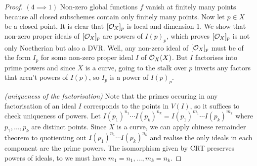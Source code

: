 \documentclass[./main.tex]{subfiles}
\begin{document}
\begin{proof}
  $(4 \implies 1)$
  Non-zero global functions $f$ vanish at finitely many points 
  because all closed subschemes contain only finitely many points. 
  Now let $p \in X$ be a closed point.
  It is clear that $[\mathcal{O}_X]_p$ is local and dimension 1.
  We show that non-zero proper ideals of $[\mathcal{O}_X]_p$ are powers of $I(p)_p$,
  which proves $[\mathcal{O}_X]_p$ is not only Noetherian but also a DVR.
  Well, any non-zero ideal of $[\mathcal{O}_X]_p$ must be of the form 
  $I_p$ for some non-zero proper ideal $I$ of $\mathcal{O}_X(X)$.
  But $I$ factorises into prime powers and since $X$ is a curve,
  going to the stalk over $p$ inverts any factors that aren't powers of $I(p)$,
  so $I_p$ is a power of $I(p)_p$.

  \textit{(uniqueness of the factorisation)}
  Note that the primes occuring in any factorisation of an ideal $I$
  corresponds to the points in $V(I)$,
  so it suffices to check uniqueness of powers. 
  Let $I(p_1)^{n_1} \cdots I(p_k)^{n_k} = I(p_1)^{m_1} \cdots I(p_k)^{m_k}$
  where $p_1, \dots, p_k$ are distinct points. 
  Since $X$ is a curve, 
  we can apply chinese remainder theorem to quotienting out 
  $I(p_1)^{n_1} \cdots I(p_k)^{n_k}$ and realise 
  the only ideals in each component are the prime powers.
  The isomorphism given by CRT preserves powers of ideals,
  to we must have $m_1 = n_1, \dots, m_k = n_k$. 

\end{proof}
\end{document}
